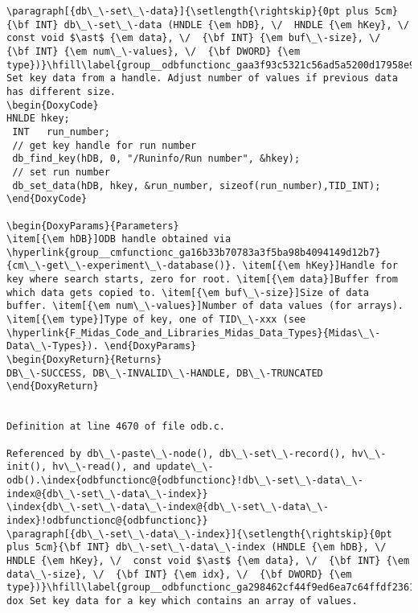 \begin{DoxyItemize}
\begin{DoxyCode}
\begin{verbatim}
\paragraph[{db\_\-set\_\-data}]{\setlength{\rightskip}{0pt plus 5cm}{\bf INT} db\_\-set\_\-data (HNDLE {\em hDB}, \/  HNDLE {\em hKey}, \/  const void $\ast$ {\em data}, \/  {\bf INT} {\em buf\_\-size}, \/  {\bf INT} {\em num\_\-values}, \/  {\bf DWORD} {\em type})}\hfill\label{group__odbfunctionc_gaa3f93c5321c56ad5a5200d17958e9bb3}
Set key data from a handle. Adjust number of values if previous data has different size. 
\begin{DoxyCode}
HNLDE hkey;
 INT   run_number;
 // get key handle for run number
 db_find_key(hDB, 0, "/Runinfo/Run number", &hkey);
 // set run number
 db_set_data(hDB, hkey, &run_number, sizeof(run_number),TID_INT);
\end{DoxyCode}
 
\begin{DoxyParams}{Parameters}
\item[{\em hDB}]ODB handle obtained via \hyperlink{group__cmfunctionc_ga16b33b70783a3f5ba98b4094149d12b7}{cm\_\-get\_\-experiment\_\-database()}. \item[{\em hKey}]Handle for key where search starts, zero for root. \item[{\em data}]Buffer from which data gets copied to. \item[{\em buf\_\-size}]Size of data buffer. \item[{\em num\_\-values}]Number of data values (for arrays). \item[{\em type}]Type of key, one of TID\_\-xxx (see \hyperlink{F_Midas_Code_and_Libraries_Midas_Data_Types}{Midas\_\-Data\_\-Types}). \end{DoxyParams}
\begin{DoxyReturn}{Returns}
DB\_\-SUCCESS, DB\_\-INVALID\_\-HANDLE, DB\_\-TRUNCATED 
\end{DoxyReturn}


Definition at line 4670 of file odb.c.

Referenced by db\_\-paste\_\-node(), db\_\-set\_\-record(), hv\_\-init(), hv\_\-read(), and update\_\-odb().\index{odbfunctionc@{odbfunctionc}!db\_\-set\_\-data\_\-index@{db\_\-set\_\-data\_\-index}}
\index{db\_\-set\_\-data\_\-index@{db\_\-set\_\-data\_\-index}!odbfunctionc@{odbfunctionc}}
\paragraph[{db\_\-set\_\-data\_\-index}]{\setlength{\rightskip}{0pt plus 5cm}{\bf INT} db\_\-set\_\-data\_\-index (HNDLE {\em hDB}, \/  HNDLE {\em hKey}, \/  const void $\ast$ {\em data}, \/  {\bf INT} {\em data\_\-size}, \/  {\bf INT} {\em idx}, \/  {\bf DWORD} {\em type})}\hfill\label{group__odbfunctionc_ga298462cf44f9ed6ea7c64ffdf23617d9}
dox Set key data for a key which contains an array of values.


\end{verbatim}
\end{DoxyCode}
\end{DoxyItemize}
